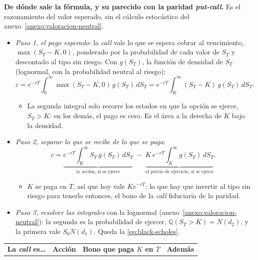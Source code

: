 \documentclass[11pt]{article}
\begin{document}
\begin{anotaciones}
\textbf{De dónde sale la fórmula, y su parecido con la paridad \emph{put-call}.} Es el razonamiento del valor esperado, sin el cálculo estocástico del anexo~\ref{anexo:valoracion-neutral}.
\begin{itemize}
\item \emph{Paso 1, el pago esperado}: la \emph{call} vale lo que se espera cobrar al vencimiento, $\max(S_T-K,0)$, ponderado por la probabilidad de cada valor de $S_T$ y descontado al tipo sin riesgo. Con $g(S_T)$, la función de densidad de $S_T$ (lognormal, con la probabilidad neutral al riesgo):
  \[
  c=e^{-rT}\int_{0}^{\infty}\max(S_T-K,0)\,g(S_T)\,dS_T=e^{-rT}\int_{K}^{\infty}(S_T-K)\,g(S_T)\,dS_T.
  \]
  \begin{itemize}
  \item La segunda integral solo recorre los estados en que la opción se ejerce, $S_T>K$: en los demás, el pago es cero. Es el área a la derecha de $K$ bajo la densidad.
  \end{itemize}
\item \emph{Paso 2, separar lo que se recibe de lo que se paga}:
  \[
  c=\underbrace{e^{-rT}\int_{K}^{\infty}S_T\,g(S_T)\,dS_T}_{\text{la acción, si se ejerce}}\;-\;\underbrace{K\,e^{-rT}\int_{K}^{\infty}g(S_T)\,dS_T}_{\text{el precio de ejercicio, si se ejerce}}.
  \]
  \begin{itemize}
  \item $K$ se paga en $T$, así que hoy vale $Ke^{-rT}$: lo que hay que invertir al tipo sin riesgo para tenerlo entonces, el bono de la \emph{call} fiduciaria de la paridad.
  \end{itemize}
\item \emph{Paso 3, resolver las integrales} con la lognormal (anexo~\ref{anexo:valoracion-neutral}): la segunda es la probabilidad de ejercer, $\mathbb{Q}(S_T>K)=N(d_2)$, y la primera vale $S_0N(d_1)$. Queda la \eqref{eq:black-scholes}. \findemo
\end{itemize}
\begin{tablacaja}
\caption{La paridad \emph{put-call} y la fórmula de  y : los mismos 2~ladrillos}\label{tab:paridad-bs}
\small
\begin{tabular}{>{\raggedright\arraybackslash}m{4.1cm}>{\centering\arraybackslash}m{2.4cm}>{\centering\arraybackslash}m{3.4cm}>{\centering\arraybackslash}m{2.6cm}}
\toprule
\rowcolor{tceeazulpalido}\textbf{La \emph{call} es…} & \textbf{Acción} & \textbf{Bono que paga $K$ en $T$} & \textbf{Además}\\

\end{tabular}
\end{tablacaja}
\end{anotaciones}
\end{document}
